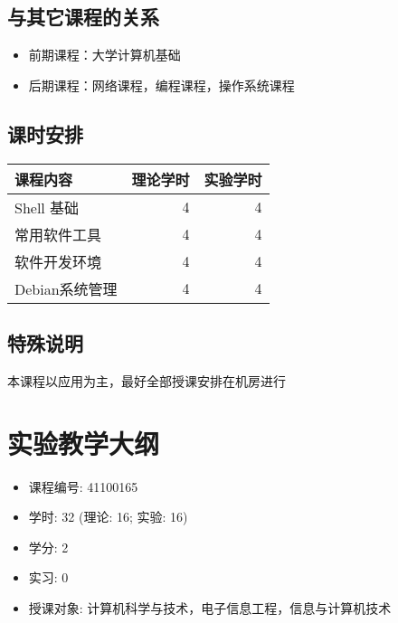 \documentclass{wx672ctexart}
\begin{document}
\subsection{与其它课程的关系}

\begin{itemize}
\item 前期课程：大学计算机基础
\item 后期课程：网络课程，编程课程，操作系统课程
\end{itemize}

\subsection{课时安排}

\begin{center}
  \begin{tabular}{lrr}
    \hline
    课程内容              &  理论学时  &  实验学时  \\
    \hline
    Shell 基础            &        4  &         4  \\
    常用软件工具          &         4  &         4  \\
    软件开发环境          &         4  &         4  \\
    Debian系统管理        &         4  &         4  \\
    \hline
  \end{tabular}
\end{center}

\subsection{特殊说明}
本课程以应用为主，最好全部授课安排在机房进行


\section{实验教学大纲}
\label{sec:lab}

\begin{itemize}
\item 课程编号: 41100165
\item 学时: 32 (理论: 16; 实验: 16)
\item 学分: 2
\item 实习: 0
\item 授课对象: 计算机科学与技术，电子信息工程，信息与计算机技术
\end{itemize}
\end{document}
